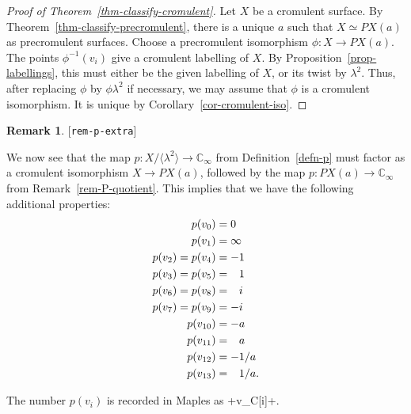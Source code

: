 \documentclass[reqno]{amsart}
\newcommand{\lbl}[1]{\label{#1}\textup{[\texttt{#1}]}\par}
\newcommand{\lbl}{\label}
\newcommand{\lm}        {\lambda}
\newcommand{\C}         {{\mathbb{C}}}
\newcommand{\ip}[1]     {\langle #1\rangle}
\newcommand{\pp}        {\hphantom{+}}
\renewcommand{\:}{\colon}
\theoremstyle{definition}
\newtheorem{remark}[theorem]{Remark}
\begin{document}
\begin{proof}[Proof of Theorem~\ref{thm-classify-cromulent}]
 Let $X$ be a cromulent surface.  By
 Theorem~\ref{thm-classify-precromulent}, there is a unique $a$ such
 that $X\simeq PX(a)$ as precromulent surfaces.  Choose a precromulent
 isomorphism $\phi\:X\to PX(a)$.  The points $\phi^{-1}(v_i)$ give a
 cromulent labelling of $X$.  By Proposition~\ref{prop-labellings},
 this must either be the given labelling of $X$, or its twist by
 $\lm^2$.  Thus, after replacing $\phi$ by $\phi\lm^2$ if necessary,
 we may assume that $\phi$ is a cromulent isomorphism.  It is unique
 by Corollary~\ref{cor-cromulent-iso}.
\end{proof}

\begin{remark}\lbl{rem-p-extra}
 We now see that the map $p\:X/\ip{\lm^2}\to\C_\infty$ from
 Definition~\ref{defn-p} must factor as a cromulent isomorphism
 $X\to PX(a)$, followed by the map $p\:PX(a)\to\C_\infty$ from
 Remark~\ref{rem-P-quotient}.  This implies that we have the
 following additional properties:
 \begin{align*}
  p(v_0) &= 0 \\
  p(v_1) &= \infty \\
  p(v_2) = p(v_4) &=    -1 \\
  p(v_3) = p(v_5) &= \pp 1 \\
  p(v_6) = p(v_8) &= \pp i \\
  p(v_7) = p(v_9) &=    -i \\
  p(v_{10}) &=      -a \\
  p(v_{11}) &= \pp   a \\
  p(v_{12}) &=    -1/a \\
  p(v_{13}) &= \pp 1/a.
 \end{align*}
\end{remark}
The number $p(v_i)$ is recorded in Maples as \mcode+v_C[i]+.
\end{document}

